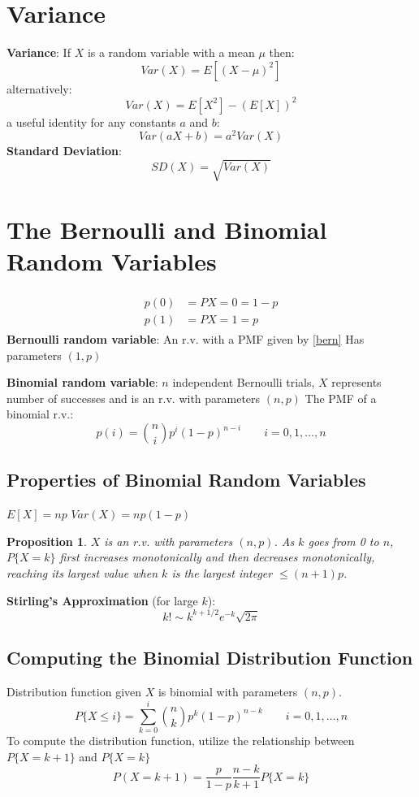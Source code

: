\documentclass[openany]{book}
\numberwithin{equation}{section}
\newtheorem{proposition}{Proposition}[section]
\begin{document}
\begin{flushleft}
\section{Variance}
\textbf{Variance}: If $X$ is a random variable with a mean $\mu$ then:
\[Var(X)=E[(X-\mu)^2]
\]
alternatively:
\[Var(X)=E[X^2]-(E[X])^2
\]
a useful identity for any constants $a$ and $b$:
\[Var(aX+b)=a^2Var(X)
\]
\textbf{Standard Deviation}:
\[SD(X)=\sqrt{Var(X)}
\]
\section{The Bernoulli and Binomial Random Variables}
\begin{align}
\label{bern}
\begin{split}
p(0)&=P{X=0}=1-p\\
p(1)&=P{X=1}=p
\end{split}
\end{align}
\textbf{Bernoulli random variable}: An r.v. with a PMF given by \ref{bern} Has parameters $(1,p)$\medbreak

\textbf{Binomial random variable}: $n$ independent Bernoulli trials, $X$ represents number of successes and is an r.v. with parameters $(n,p)$\medbreak
The PMF of a binomial r.v.:
\begin{equation}
p(i)=\binom{n}{i}p^i(1-p)^{n-i} \qquad i=0,1,\dots,n
\end{equation}
\subsection{Properties of Binomial Random Variables}
$E[X]=np$ \medbreak
$Var(X)=np(1-p)$
\begin{proposition}
$X$ is an r.v. with parameters $(n,p)$. As $k$ goes from 0 to $n$, $P\{X=k\}$ first increases monotonically and then decreases monotonically, reaching its largest value when $k$ is the largest integer $\leq (n+1)p$.
\end{proposition}
\textbf{Stirling's Approximation} (for large $k$):
\[k!\sim k^{k+1/2}e^{-k}\sqrt{2\pi}
\]
\subsection{Computing the Binomial Distribution Function}
Distribution function given $X$ is binomial with parameters $(n,p)$.
\[P\{X\leq i\}=\sum_{k=0}^{i}\binom{n}{k}p^k(1-p)^{n-k} \qquad i=0,1,\dots,n
\]
To compute the distribution function, utilize the relationship between $P\{X=k+1\}$ and $P\{X=k\}$
\begin{equation}
\label{bind}
P(X=k+1)=\frac{p}{1-p}\frac{n-k}{k+1}P\{X=k\}
\end{equation}

\end{flushleft}
\end{document}
